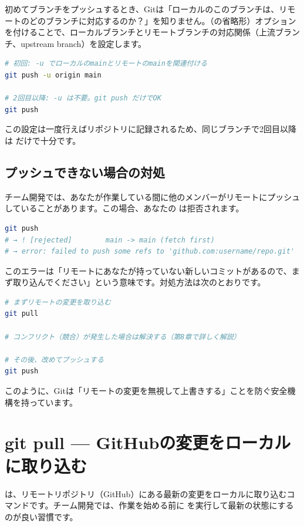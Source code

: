 初めてブランチをプッシュするとき、Gitは「ローカルのこのブランチは、リモートのどのブランチに対応するのか？」を知りません。（の省略形）オプションを付けることで、ローカルブランチとリモートブランチの対応関係（上流ブランチ、upstream branch）を設定します。

\begin{lstlisting}[language=bash]
# 初回: -u でローカルのmainとリモートのmainを関連付ける
git push -u origin main

# 2回目以降: -u は不要。git push だけでOK
git push
\end{lstlisting}

この設定は一度行えばリポジトリに記録されるため、同じブランチで2回目以降は  だけで十分です。

\subsection{プッシュできない場合の対処}

チーム開発では、あなたが作業している間に他のメンバーがリモートにプッシュしていることがあります。この場合、あなたの  は拒否されます。

\begin{lstlisting}[language=bash]
git push
# → ! [rejected]        main -> main (fetch first)
# → error: failed to push some refs to 'github.com:username/repo.git'
\end{lstlisting}

このエラーは「リモートにあなたが持っていない新しいコミットがあるので、まず取り込んでください」という意味です。対処方法は次のとおりです。

\begin{lstlisting}[language=bash]
# まずリモートの変更を取り込む
git pull

# コンフリクト（競合）が発生した場合は解決する（第8章で詳しく解説）

# その後、改めてプッシュする
git push
\end{lstlisting}

このように、Gitは「リモートの変更を無視して上書きする」ことを防ぐ安全機構を持っています。

\section{git pull — GitHubの変更をローカルに取り込む}

 は、リモートリポジトリ（GitHub）にある最新の変更をローカルに取り込むコマンドです。チーム開発では、作業を始める前に  を実行して最新の状態にするのが良い習慣です。

